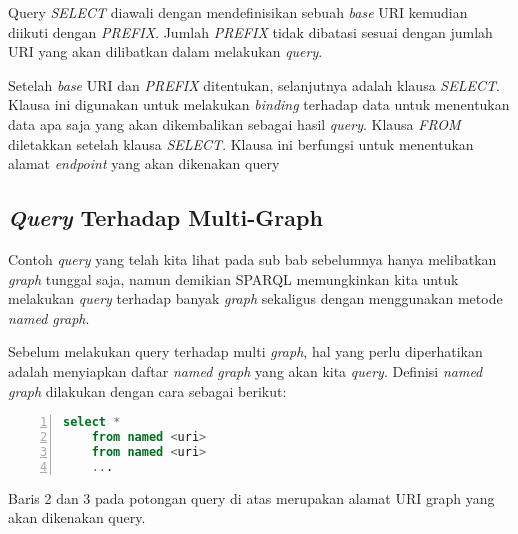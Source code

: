Query \emph{SELECT} diawali dengan mendefinisikan sebuah \emph{base} URI kemudian diikuti dengan \emph{PREFIX}. Jumlah \emph{PREFIX} tidak dibatasi sesuai dengan jumlah URI yang akan dilibatkan dalam melakukan \emph{query}.

Setelah \emph{base} URI dan \emph{PREFIX} ditentukan, selanjutnya adalah klausa \emph{SELECT}. Klausa ini digunakan untuk melakukan \emph{binding} terhadap data untuk menentukan data apa saja yang akan dikembalikan sebagai hasil \emph{query}. Klausa \emph{FROM} diletakkan setelah klausa \emph{SELECT}. Klausa ini berfungsi untuk menentukan alamat \emph{endpoint} yang akan dikenakan query

\subsection{\emph{Query} Terhadap Multi-Graph}
Contoh \emph{query} yang telah kita lihat pada sub bab sebelumnya hanya melibatkan \emph{graph} tunggal saja, namun demikian SPARQL memungkinkan kita untuk melakukan \emph{query} terhadap banyak \emph{graph} sekaligus dengan menggunakan metode \emph{named graph}.

Sebelum melakukan query terhadap multi \emph{graph}, hal yang perlu diperhatikan adalah menyiapkan daftar \emph{named graph} yang akan kita \emph{query}. Definisi \emph{named graph} dilakukan dengan cara sebagai berikut:

\begin{lstlisting}[language=SQL, xleftmargin=15pt, numbers=left]
	select *
	from named <uri>
	from named <uri>
	...
\end{lstlisting}

Baris 2 dan 3 pada potongan query di atas merupakan alamat URI graph yang akan dikenakan query.